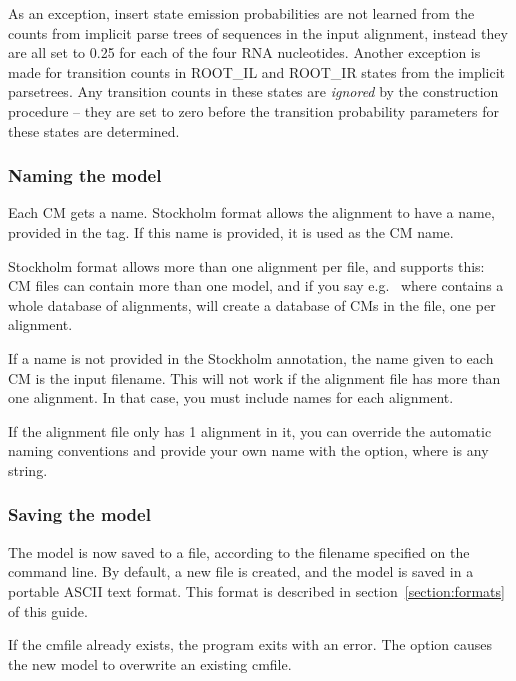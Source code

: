 As an exception, insert state emission probabilities are not learned
from the counts from implicit parse trees of sequences in the input
alignment, instead they are all set to 0.25 for each of the four RNA
nucleotides.  Another exception is made for transition counts in
ROOT\_IL and ROOT\_IR states from the implicit parsetrees. Any
transition counts in these states are \emph{ignored} by the
construction procedure -- they are set to zero before the transition
probability parameters for these states are determined.

\subsubsection{Naming the model}

Each CM gets a name. Stockholm format allows the alignment to have a
name, provided in the  tag. If this name is provided,
it is used as the CM name.

Stockholm format allows more than one alignment per file, and
 supports this: CM files can contain more than one
model, and if you say e.g.\  where
 contains a whole database of alignments,
 will create a database of CMs in the  file,
one per alignment. 

If a name is not provided in the Stockholm 
annotation, the name given to each CM is the input filename. This will
not work if the alignment file has more than one alignment. In that
case, you must include names for each alignment.

If the alignment file only has 1 alignment in it, you can override the
automatic naming conventions and provide your own name with the 
option, where  is any string. 

\subsubsection{Saving the model}

The model is now saved to a file, according to the filename specified
on the command line. By default, a new file is created, and the model
is saved in a portable ASCII text format. This format is described in
section~\ref{section:formats} of this guide.

If the cmfile already exists, the program exits with an error. The
 option causes the new model to overwrite an existing
cmfile. 

